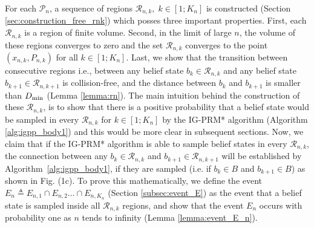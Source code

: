 \documentclass[Afour,sageh,times]{sagej}
\begin{document}
For each $\mathcal{P}_n$, a sequence of regions $\mathcal{R}_{n,k}, \;k\in[1;K_n]$ is constructed (Section \ref{sec:construction_free_rnk}) which posses three important properties. First, each $\mathcal{R}_{n,k}$ is a region of finite volume. Second, in the limit of large $n$, the volume of these regions converges to zero and the set $\mathcal{R}_{n,k}$ converges to the point $(x_{n,k},P_{n,k})$ for all $k\in[1;K_n]$. Last, we show that the transition between consecutive regions i.e., between any belief state  $b_k \in \mathcal{R}_{n,k}$ and any belief state $b_{k+1} \in \mathcal{R}_{n,k+1}$ is collision-free, and the distance between $b_k$ and $b_{k+1}$ is smaller than $D_{\textup{min}}$ (Lemma \ref{lemma:rn}). The main intuition behind the construction of these $\mathcal{R}_{n,k}$, is to show that there is a positive probability that a belief state would be sampled in every $\mathcal{R}_{n,k}$ for $k\in[1;K_n]$ by the IG-PRM* algorithm (Algorithm \ref{alg:igpp_body1}) and this would be more clear in subsequent sections. Now, we claim that if the IG-PRM* algorithm is able to sample belief states in every $\mathcal{R}_{n,k}$, the connection between any $b_k \in \mathcal{R}_{n,k}$ and $b_{k+1} \in \mathcal{R}_{n,k+1}$ will be established by Algorithm~\ref{alg:igpp_body1}, if they are sampled (i.e. if $b_k \in B$ and $b_{k+1} \in B$) as shown in Fig. (1c). To prove this mathematically, we define the event $E_{n} \triangleq E_{n,1}\cap E_{n,2}\dots \cap E_{n,K_n}$ (Section \ref{subsec:event_E}) as the event that a belief state is sampled inside all $\mathcal{R}_{n,k}$ regions, and show that the event $E_n$ occurs with probability one as $n$ tends to infinity (Lemma \ref{lemma:event_E_n}).
\end{document}
